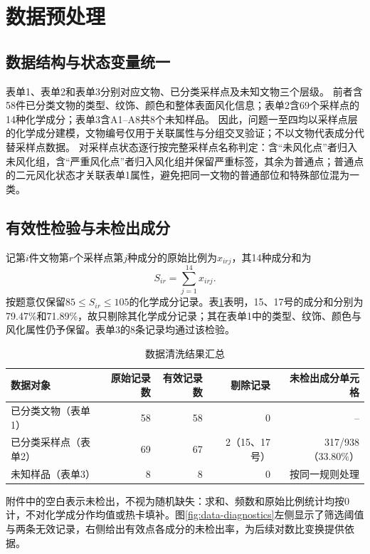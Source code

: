 \section{数据预处理}
\label{sec:data}

\subsection{数据结构与状态变量统一}
表单1、表单2和表单3分别对应文物、已分类采样点及未知文物三个层级。
前者含58件已分类文物的类型、纹饰、颜色和整体表面风化信息；表单2含69个采样点的14种化学成分；表单3含A1--A8共8个未知样品。
因此，问题一至四均以采样点层的化学成分建模，文物编号仅用于关联属性与分组交叉验证；不以文物代表成分代替采样点数据。
对采样点状态逐行按完整采样点名称判定：含``未风化点''者归入未风化组，含``严重风化点''者归入风化组并保留严重标签，其余为普通点；普通点的二元风化状态才关联表单1属性，避免把同一文物的普通部位和特殊部位混为一类。

\subsection{有效性检验与未检出成分}
记第\(i\)件文物第\(r\)个采样点第\(j\)种成分的原始比例为\(x_{irj}\)，其14种成分和为
\begin{equation}
    S_{ir}=\sum_{j=1}^{14}x_{irj}.
    \label{eq:composition-sum}
\end{equation}
按题意仅保留\(85\leq S_{ir}\leq105\)的化学成分记录。表\ref{tab:data-cleaning}表明，15、17号的成分和分别为79.47\%和71.89\%，故只剔除其化学成分记录；其在表单1中的类型、纹饰、颜色与风化属性仍予保留。表单3的8条记录均通过该检验。

\begin{table}[H]
    \centering
    \caption{数据清洗结果汇总}
    \label{tab:data-cleaning}
    \small
    \begin{tabular}{lrrrr}
        \toprule
        数据对象 & 原始记录数 & 有效记录数 & 剔除记录 & 未检出成分单元格 \\
        \midrule
        已分类文物（表单1） & 58 & 58 & 0 & -- \\
        已分类采样点（表单2） & 69 & 67 & 2（15、17号） & 317/938（33.80\%） \\
        未知样品（表单3） & 8 & 8 & 0 & 按同一规则处理 \\
        \bottomrule
    \end{tabular}
\end{table}

附件中的空白表示未检出，不视为随机缺失：求和、频数和原始比例统计均按0计，不对化学成分作均值或热卡填补。图\ref{fig:data-diagnostics}左侧显示了筛选阈值与两条无效记录，右侧给出有效点各成分的未检出率，为后续对数比变换提供依据。

